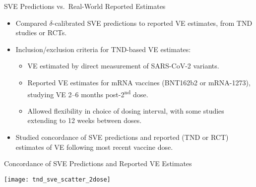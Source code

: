 \documentclass{beamer}
\begin{document}

\begin{frame}[c]{SVE Predictions vs.~Real-World Reported Estimates}

\begin{center}
\begin{itemize}
  \itemsep6pt
  \item Compared $\delta$-calibrated SVE predictions to reported VE estimates,
      from TND studies or RCTs.
  \item Inclusion/exclusion criteria for TND-based VE estimates\footnotemark:
    \begin{itemize}
      \itemsep2pt
      \item VE estimated by direct measurement of SARS-CoV-2 variants.
      \item Reported VE estimates for mRNA vaccines (BNT162b2 or mRNA-1273),
        studying VE 2--6 months post-2\textsuperscript{nd} dose.
      \item Allowed flexibility in choice of dosing interval, with some studies
        extending to 12 weeks between doses.
    \end{itemize}
  \item Studied concordance of SVE predictions and reported (TND or RCT)
      estimates of VE following most recent vaccine dose.
\end{itemize}
\end{center}


\note{
}

\end{frame}







\begin{frame}[c]{Concordance of SVE Predictions and Reported VE Estimates}

\hspace*{-0.5cm}\texttt{[image: tnd\_sve\_scatter\_2dose]}

\note{
}

\end{frame}
\end{document}
